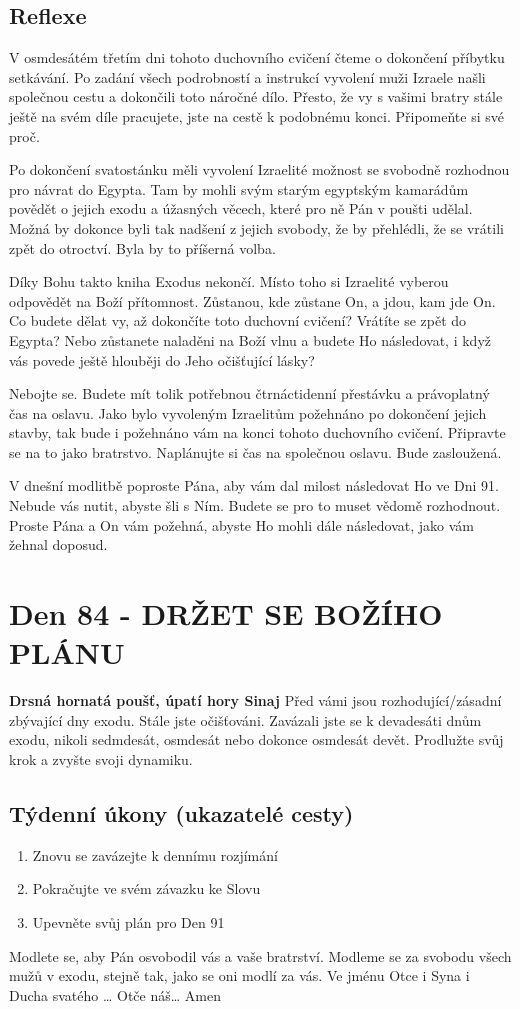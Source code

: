 \documentclass[11pt]{article}
\newcommand{\zacatekDvanactyTyden}{
\textbf{Drsná hornatá poušť, úpatí hory Sinaj} \newline 
Před vámi jsou rozhodující/zásadní zbývající dny exodu. Stále jste očišťováni. Zavázali jste se k devadesáti dnům exodu, nikoli sedmdesát, osmdesát nebo dokonce osmdesát devět. Prodlužte svůj krok a zvyšte svoji dynamiku.

\subsection*{Týdenní úkony (ukazatelé cesty)}
\begin{enumerate}
  \item Znovu se zavázejte k dennímu rozjímání
  \item Pokračujte ve svém závazku ke Slovu
  \item Upevněte svůj plán pro Den 91
\end{enumerate}
Modlete se, aby Pán osvobodil vás a vaše bratrství. \newline
Modleme se za svobodu všech mužů v exodu, stejně tak, jako se oni modlí za vás.\newline
Ve jménu Otce i Syna i Ducha svatého …  Otče náš… Amen
}
\begin{document}
\subsection*{Reflexe}
V osmdesátém třetím dni tohoto duchovního cvičení čteme o dokončení příbytku setkávání. Po zadání všech podrobností a
instrukcí vyvolení muži Izraele našli společnou cestu a dokončili toto náročné dílo. Přesto, že vy s vašimi bratry stále ještě na svém
díle pracujete, jste na cestě k podobnému konci. Připomeňte si své proč.

Po dokončení svatostánku měli vyvolení Izraelité možnost se svobodně rozhodnou pro návrat do Egypta. Tam by mohli svým
starým egyptským kamarádům povědět o jejich exodu a úžasných věcech, které pro ně Pán v poušti udělal. Možná by dokonce byli
tak nadšení z jejich svobody, že by přehlédli, že se vrátili zpět do otroctví. Byla by to příšerná volba.

Díky Bohu takto kniha Exodus nekončí. Místo toho si Izraelité vyberou odpovědět na Boží přítomnost. Zůstanou, kde zůstane On,
a jdou, kam jde On. Co budete dělat vy, až dokončíte toto duchovní cvičení? Vrátíte se zpět do Egypta? Nebo zůstanete naladěni na
Boží vlnu a budete Ho následovat, i když vás povede ještě hlouběji do Jeho očišťující lásky?

Nebojte se. Budete mít tolik potřebnou čtrnáctidenní přestávku a právoplatný čas na oslavu. Jako bylo vyvoleným Izraelitům
požehnáno po dokončení jejich stavby, tak bude i požehnáno vám na konci tohoto duchovního cvičení. Připravte se na to jako
bratrstvo. Naplánujte si čas na společnou oslavu. Bude zasloužená.

V dnešní modlitbě poproste Pána, aby vám dal milost následovat Ho ve Dni 91. Nebude vás nutit, abyste šli s Ním. Budete se pro
to muset vědomě rozhodnout. Proste Pána a On vám požehná, abyste Ho mohli dále následovat, jako vám žehnal doposud.


\newpage
\section{Den 84 - DRŽET SE BOŽÍHO PLÁNU}
\zacatekDvanactyTyden
\end{document}
